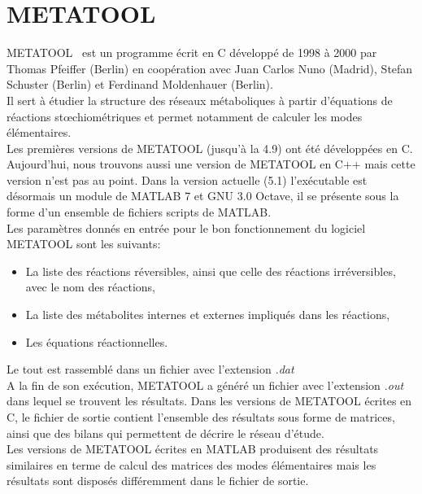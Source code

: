 \section{METATOOL} 
METATOOL~\cite{metatool:url} est un programme écrit en C développé de 1998 à 2000 par Thomas Pfeiffer (Berlin) en coopération avec Juan Carlos Nuno (Madrid), Stefan Schuster (Berlin) et Ferdinand Moldenhauer (Berlin).\\
Il sert à étudier la structure des réseaux métaboliques à partir d'équations de réactions stœchiométriques et permet notamment de calculer les modes élémentaires.\\
Les premières versions de METATOOL (jusqu'à la 4.9) ont été développées en C. Aujourd'hui, nous trouvons aussi une version de METATOOL en C++ mais cette version n'est pas au point. %
Dans la version actuelle (5.1) l'exécutable est désormais un module de MATLAB 7 et GNU 3.0 Octave, il se présente sous la forme d'un ensemble de fichiers scripts de MATLAB.\\

Les paramètres donnés en entrée pour le bon fonctionnement du logiciel METATOOL sont les suivants:
\begin{itemize}
\item La liste des réactions réversibles, ainsi que celle des réactions irréversibles, avec le nom des réactions,
\item La liste des métabolites internes et externes impliqués dans les réactions,
\item Les équations réactionnelles.
\end{itemize}
Le tout est rassemblé dans un fichier avec l'extension \textit{.dat}\\

A la fin de son exécution, METATOOL a généré un fichier avec l'extension \textit{.out} dans lequel se trouvent les résultats. Dans les versions de METATOOL écrites en C, le fichier de sortie contient l'ensemble des résultats sous forme de matrices, ainsi que des bilans qui permettent de décrire le réseau d'étude.\\
Les versions de METATOOL écrites en MATLAB produisent des résultats similaires en terme de calcul des matrices des modes élémentaires mais les résultats sont disposés différemment dans le fichier de sortie.

